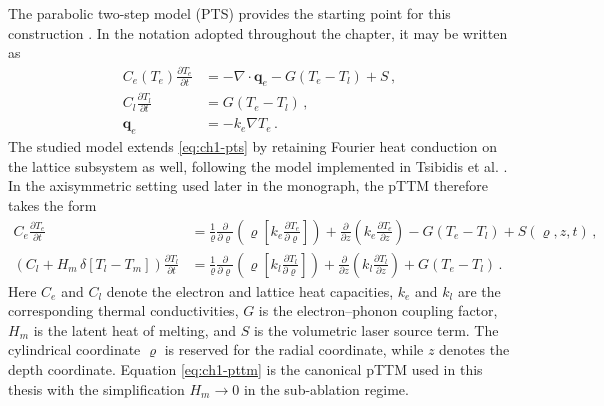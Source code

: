 The parabolic two-step model (PTS) provides the starting point for this construction \cite{Alexopoulou_2023}. In the notation adopted throughout the chapter, it may be written as
\begin{subequations}\label{eq:ch1-pts}
  \begin{align}
    C_e(T_e)\frac{\partial T_e}{\partial t} & = - \nabla \cdot \mathbf{q}_e - G(T_e - T_l) + S \, , \label{eq:ch1-pts-e} \\
    C_l\frac{\partial T_l}{\partial t}      & = G(T_e - T_l) \, , \label{eq:ch1-pts-l}                                   \\
    \mathbf{q}_e                            & = - k_e \nabla T_e \, . \label{eq:ch1-pts-q}
  \end{align}
\end{subequations}
The studied model extends \eqref{eq:ch1-pts} by retaining Fourier heat conduction on the lattice subsystem as well, following the model implemented in Tsibidis et al. \cite{Fraggelakis_2021}.
In the axisymmetric setting used later in the monograph, the pTTM therefore takes the form
\begin{subequations}\label{eq:ch1-pttm}
  \begin{align}
    C_e \frac{\partial T_e}{\partial t}                                         & = \frac{1}{\varrho}\frac{\partial}{\partial \varrho}\left(\varrho \left[k_e \frac{\partial T_e}{\partial \varrho}\right]\right) + \frac{\partial}{\partial z}\left(k_e \frac{\partial T_e}{\partial z}\right) - G(T_e - T_l) + S(\varrho,z,t) \, , \label{eq:ch1-pttm-e} \\
    \left(C_l + H_m \, \delta[T_l - T_m]\right) \frac{\partial T_l}{\partial t} & = \frac{1}{\varrho}\frac{\partial}{\partial \varrho}\left(\varrho \left[k_l \frac{\partial T_l}{\partial \varrho}\right]\right) + \frac{\partial}{\partial z}\left(k_l \frac{\partial T_l}{\partial z}\right) + G(T_e - T_l) \, . \label{eq:ch1-pttm-l}
  \end{align}
\end{subequations}
Here \(C_e\) and \(C_l\) denote the electron and lattice heat capacities, \(k_e\) and \(k_l\) are the corresponding thermal conductivities, \(G\) is the electron--phonon coupling factor, \(H_m\) is the latent heat of melting, and \(S\) is the volumetric laser source term. The cylindrical coordinate \(\varrho\) is reserved for the radial coordinate, while \(z\) denotes the depth coordinate.
Equation \eqref{eq:ch1-pttm} is the canonical pTTM used in this thesis with the simplification \(H_m \rightarrow 0\) in the sub-ablation regime.

